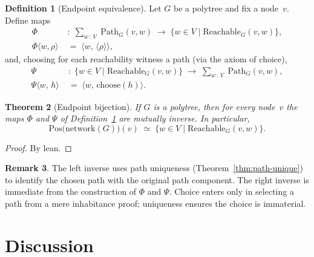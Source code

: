 \documentclass[11pt,a4paper]{article}
\theoremstyle{plain}
\newtheorem{theorem}{Theorem}[section]
\theoremstyle{definition}
\newtheorem{definition}[theorem]{Definition}
\newtheorem{remark}[theorem]{Remark}
\newcommand{\Pos}{\mathrm{Pos}}
\begin{document}
\begin{definition}[Endpoint equivalence]\label{def:endpoint-equiv}
Let $G$ be a polytree and fix a node~$v$. Define maps
\begin{align}
  \Phi
  &\;:\;
  \sum_{w \,:\, V}\; \mathrm{Path}_G(v,w)
  \;\longrightarrow\;
  \bigl\{ w \in V \mid \mathrm{Reachable}_G(v,w) \bigr\}, \\[4pt]
  \Phi\bigl\langle w,\rho \bigr\rangle
  &\;=\;
  \bigl\langle w,\, \langle\rho\rangle \bigr\rangle,
\end{align}
and, choosing for each reachability witness a path (via the axiom of choice),
\begin{align}
  \Psi
  &\;:\;
  \bigl\{ w \in V \mid \mathrm{Reachable}_G(v,w) \bigr\}
  \;\longrightarrow\;
  \sum_{w \,:\, V}\; \mathrm{Path}_G(v,w), \\[4pt]
  \Psi\bigl\langle w,\, h \bigr\rangle
  &\;=\;
  \bigl\langle w,\, \mathrm{choose}(h) \bigr\rangle.
\end{align}
\end{definition}

\begin{theorem}[Endpoint bijection]\label{thm:endpoint-equiv}
If $G$ is a polytree, then for every node~$v$ the maps $\Phi$ and $\Psi$ of
Definition~\ref{def:endpoint-equiv} are mutually inverse. In particular,
\begin{equation}
  \Pos\bigl(\mathrm{network}(G)\bigr)(v)
  \;\simeq\;
  \bigl\{ w \in V \mid \mathrm{Reachable}_G(v,w) \bigr\}.
\end{equation}
\end{theorem}

\begin{proof}
By lean.
\end{proof}

\begin{remark}
The left inverse uses path uniqueness (Theorem~\ref{thm:path-unique}) to
identify the chosen path with the original path component. The right inverse is
immediate from the construction of $\Phi$ and $\Psi$. Choice enters only in
selecting a path from a mere inhabitance proof; uniqueness ensures the choice
is immaterial.
\end{remark}

\section{Discussion}
\end{document}

